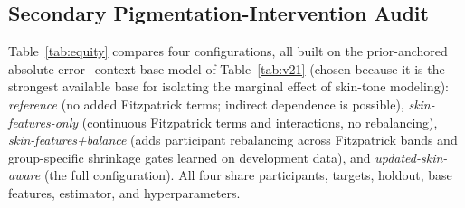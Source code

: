 \documentclass[12pt]{article}
\begin{document}
\subsection{Secondary Pigmentation-Intervention Audit}
\label{sec:equity}
Table~\ref{tab:equity} compares four configurations, all built on the prior-anchored absolute-error+context base model of Table~\ref{tab:v21} (chosen because it is the strongest available base for isolating the marginal effect of skin-tone modeling): \emph{reference} (no added Fitzpatrick terms; indirect dependence is possible), \emph{skin-features-only} (continuous Fitzpatrick terms and interactions, no rebalancing), \emph{skin-features+balance} (adds participant rebalancing across Fitzpatrick bands and group-specific shrinkage gates learned on development data), and \emph{updated-skin-aware} (the full configuration). All four share participants, targets, holdout, base features, estimator, and hyperparameters.
\begin{table}[t]
\centering
\caption{Historical Fixed-Split Skin-Tone Model Comparison (168 Evaluation Participants)}
\label{tab:equity}
\footnotesize
{}
\end{table}
\end{document}
